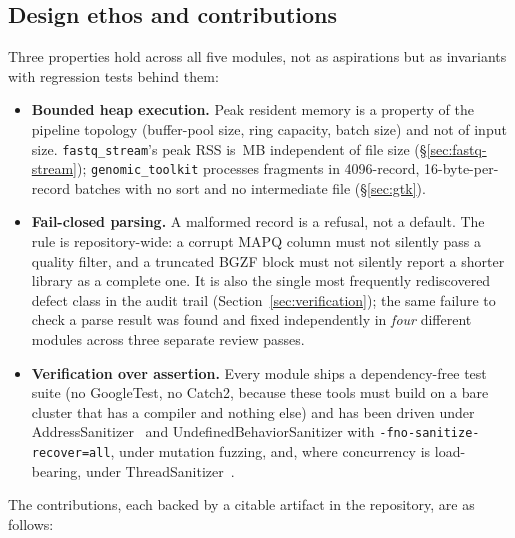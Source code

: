 \documentclass[10pt,twocolumn]{article}
\begin{document}
\subsection{Design ethos and contributions}

Three properties hold across all five modules, not as aspirations but as
invariants with regression tests behind them:

\begin{itemize}\itemsep2pt
\item \textbf{Bounded heap execution.} Peak resident memory is a property of
  the pipeline topology (buffer-pool size, ring capacity, batch size) and not
  of input size. \texttt{fastq\_stream}'s peak RSS is \FqPeakRss{}\,MB
  independent of file size (\S\ref{sec:fastq-stream});
  \texttt{genomic\_toolkit} processes fragments in 4096-record,
  16-byte-per-record batches with no sort and no intermediate file
  (\S\ref{sec:gtk}).
\item \textbf{Fail-closed parsing.} A malformed record is a refusal, not a
  default. The rule is repository-wide: a corrupt MAPQ column must not
  silently pass a quality filter, and a truncated BGZF block must not
  silently report a shorter library as a complete one. It is also the single
  most frequently rediscovered defect class in the audit trail
  (Section~\ref{sec:verification}); the same failure to check a parse result
  was found and fixed independently in \emph{four} different modules across
  three separate review passes.
\item \textbf{Verification over assertion.} Every module ships a
  dependency-free test suite (no GoogleTest, no Catch2, because these tools
  must build on a bare cluster that has a compiler and nothing else) and has
  been driven under AddressSanitizer~\citep{serebryany2012asan} and
  UndefinedBehaviorSanitizer with \texttt{-fno-sanitize-recover=all}, under
  mutation fuzzing, and, where concurrency is load-bearing, under
  ThreadSanitizer~\citep{serebryany2009tsan}.
\end{itemize}

The contributions, each backed by a citable artifact in the repository, are
as follows:
\end{document}
